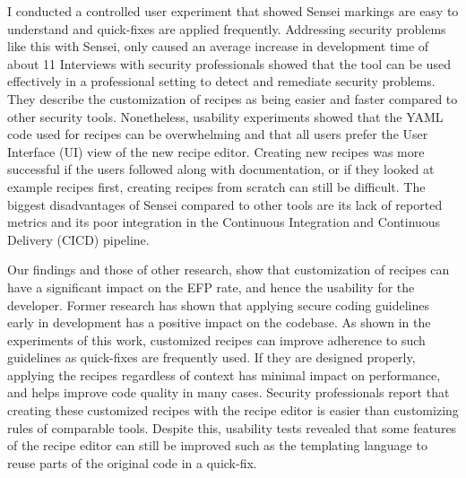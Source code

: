 I conducted a controlled user experiment that showed Sensei
markings are easy to understand and quick-fixes are applied frequently. Addressing security problems like this with Sensei, only
caused an average increase in development time of about 11%
Interviews with security professionals showed that the tool can be
used effectively in a professional setting to detect and remediate
security problems. They describe the customization of recipes as
being easier and faster compared to other security tools. Nonetheless, usability experiments showed that the YAML code used for
recipes can be overwhelming and that all users prefer the User Interface (UI) view of the new recipe editor. Creating new recipes
was more successful if the users followed along with documentation, or if they looked at example recipes first, creating recipes
from scratch can still be difficult.
The biggest disadvantages of Sensei compared to other tools are
its lack of reported metrics and its poor integration in the Continuous Integration and Continuous Delivery (CICD) pipeline.

Our findings and those of other research, show that customization
of recipes can have a significant impact on the EFP rate, and
hence the usability for the developer. Former research has shown
that applying secure coding guidelines early in development has
a positive impact on the codebase. As shown in the experiments
of this work, customized recipes can improve adherence to such
guidelines as quick-fixes are frequently used. If they are designed
properly, applying the recipes regardless of context has minimal
impact on performance, and helps improve code quality in many
cases.
Security professionals report that creating these customized
recipes with the recipe editor is easier than customizing rules
of comparable tools. Despite this, usability tests revealed that
some features of the recipe editor can still be improved such as
the templating language to reuse parts of the original code in a
quick-fix.




